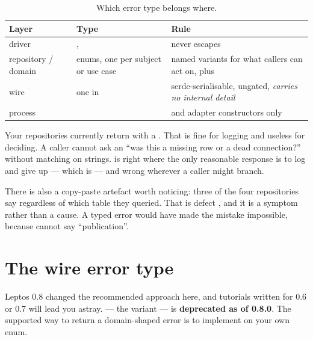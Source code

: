 \begin{table}[htbp]
\centering
\caption{Which error type belongs where.}
\label{tab:errors}
\small
\begin{tabular}{@{}L{0.18\textwidth}L{0.28\textwidth}L{0.46\textwidth}@{}}
\toprule
\textbf{Layer} & \textbf{Type} & \textbf{Rule} \\
\midrule
driver & ,  & never escapes  \\
repository / domain &  enums, one per subject or use case & named variants for what callers can act on, plus  \\
wire & one  in  & serde-serialisable, ungated, \emph{carries no internal detail} \\
process &  &  and adapter constructors only \\
\bottomrule
\end{tabular}
\end{table}

\begin{why}
Your repositories currently return  with a . That is fine for logging and useless for deciding. A caller cannot
ask an  ``was this a missing row or a dead connection?'' without matching on
strings.  is right where the only reasonable response is to log and give up --- which
is  --- and wrong wherever a caller might branch.

There is also a copy-paste artefact worth noticing: three of the four repositories say
 regardless of which table they queried. That is
defect , and it is a symptom rather than a cause. A typed error would have made the
mistake impossible, because  cannot say ``publication''.
\end{why}

\section{The wire error type}

Leptos 0.8 changed the recommended approach here, and tutorials written for 0.6 or 0.7 will lead
you astray.  --- the  variant --- is
\textbf{deprecated as of 0.8.0}. The supported way to return a domain-shaped error is to implement
 on your own enum.

